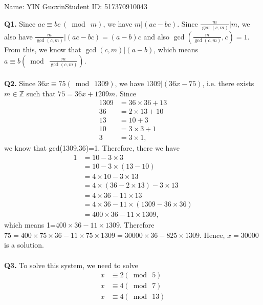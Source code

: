\documentclass{article}[12pt]
\begin{document}
\noindent

\noindent{}
\begin{center}
\footnotesize{\quad Name: YIN Guoxin\quad Student ID: 517370910043}


\end{center}

\noindent \textbf{Q1.}
Since $a c \equiv b c\ (\bmod\  m)$, we have $m|(ac-bc)$. Since $\frac{m}{\operatorname{gcd}(c, m)}|m$, we also have $\frac{m}{\operatorname{gcd}(c, m)}|(ac-bc)=(a-b)c$ and also $\operatorname{gcd}(\frac{m}{\operatorname{gcd}(c, m)},c)=1$. From this, we know that $\operatorname{gcd}(c, m)|(a-b)$, which means $a \equiv b\left(\bmod\ \frac{m}{\operatorname{gcd}(c, m)}\right)$.
\\ 
\\
\noindent \textbf{Q2.}
Since 36$x \equiv 75(\bmod\ 1309)$, we have $1309|(36x-75)$, i.e. there exists $m\in \mathbb{Z}$ such that $75=36x+1209m$. Since 
\begin{align*}
1309&=36\times 36+13\\
36&=2\times 13+10\\
13&=10+3\\
10&=3\times 3+1\\
3&=3\times 1,
\end{align*} we know that gcd(1309,36)=1. Therefore, there we have 
\begin{align*}
1&=10-3\times 3\\
&=10-3\times (13-10)\\
&=4\times 10-3\times 13\\
&=4\times (36-2\times 13)-3\times 13\\
&=4\times 36-11\times 13\\
&=4\times 36-11\times (1309-36\times 36)\\
&=400\times 36-11\times 1309,
\end{align*}
which means 1=$400\times 36-11\times 1309$. Therefore $75=400\times 75\times 36-11\times 75\times 1309=30000\times 36-825\times 1309$. Hence, $x=30000$ is a solution.\\ \\
\noindent \textbf{Q3.}
To solve this system, we need to solve 
\begin{align*}
x&\equiv 2 (\bmod\ 5)\\
x&\equiv 4 (\bmod\ 7)\\
x&\equiv 4 (\bmod\ 13)
\end{align*}
\end{document}
